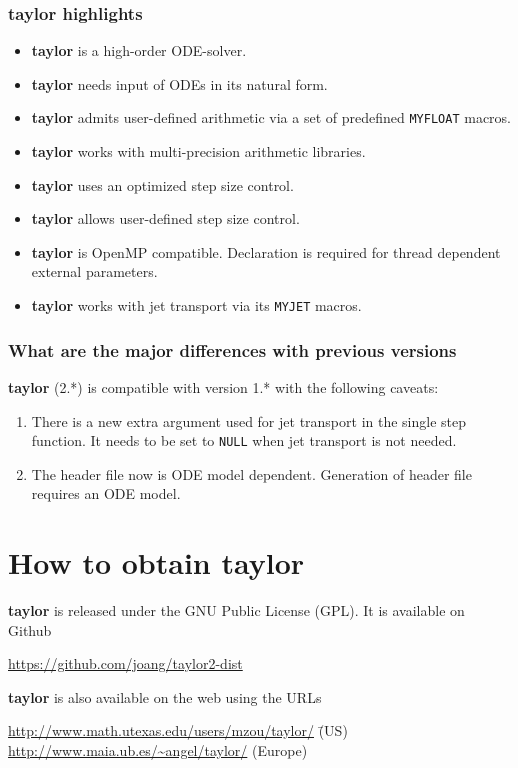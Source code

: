 \documentclass[10pt]{article}
\theoremstyle{remark}
\newcommand{\taylorname}{{\bf taylor}}
\newcommand{\myfloat}{{\tt MY\symbol{95}FLOAT}}
\newcommand{\myjet}{{\tt MY\symbol{95}JET}}
\begin{document}
\subsubsection*{\taylorname{} highlights}

\begin{itemize}
    \item \taylorname{} is a high-order ODE-solver.
    \item \taylorname{} needs input of ODEs in its natural form.
    \item \taylorname{} admits user-defined arithmetic via a set of predefined
      \myfloat{} macros.
    \item \taylorname{} works with multi-precision arithmetic libraries.
    \item \taylorname{} uses an optimized step size control.
    \item \taylorname{} allows user-defined step size control.
    \item \taylorname{} is OpenMP compatible. Declaration is required
      for thread dependent external parameters.
    \item \taylorname{} works with jet transport via its \myjet{}
      macros.
\end{itemize}

\subsubsection*{What are the major differences with previous versions}
\taylorname{} (2.*) is compatible with version 1.* with the following
caveats:
\begin{enumerate}
\renewcommand{\labelenumi}{\theenumi.)}
    \item There is a new extra argument used for jet transport in the
      single step function. It needs to be set to \verb+NULL+ when jet
      transport is not needed.
    \item The header file now is ODE model dependent. Generation of
      header file requires an ODE model.
\end{enumerate}

\section{How to obtain \taylorname{}} \label{sec:download}
\taylorname{} is released under the GNU Public License (GPL).  It is
available on Github
\begin{tabbing}
    \url{https://github.com/joang/taylor2-dist}
\end{tabbing}
\taylorname{} is also available on the web using the URLs
\begin{tabbing}
    \url{http://www.math.utexas.edu/users/mzou/taylor/}\hspace*{5mm} \= (US)\\
    \url{http://www.maia.ub.es/~angel/taylor/} \> (Europe)
\end{tabbing}
\end{document}
